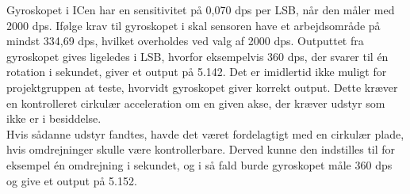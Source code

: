 Gyroskopet i ICen har en sensitivitet på 0,070 dps per LSB, når den måler med 2000 dps. Ifølge krav til gyroskopet i  skal sensoren have et arbejdsområde på mindst 334,69 dps, hvilket overholdes ved valg af 2000 dps. Outputtet fra gyroskopet gives ligeledes i LSB, hvorfor eksempelvis 360 dps, der svarer til én rotation i sekundet, giver et output på 5.142. Det er imidlertid ikke muligt for projektgruppen at teste, hvorvidt gyroskopet giver korrekt output. Dette kræver en kontrolleret cirkulær acceleration om en given akse, der kræver udstyr som ikke er i besiddelse.\\
Hvis sådanne udstyr fandtes, havde det været fordelagtigt med en cirkulær plade, hvis omdrejninger skulle være kontrollerbare. Derved kunne den indstilles til for eksempel én omdrejning i sekundet, og i så fald burde gyroskopet måle 360 dps og give et output på 5.152.
%
%
%
